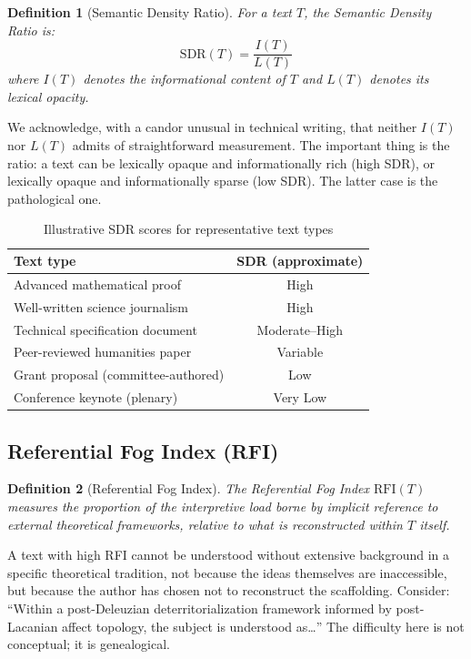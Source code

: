 \documentclass[12pt, a4paper]{article}
\newtheorem{definition}{Definition}
\begin{document}
\begin{definition}[Semantic Density Ratio]
For a text $T$, the Semantic Density Ratio is:
\[
\mathrm{SDR}(T) = \frac{I(T)}{L(T)}
\]
where $I(T)$ denotes the informational content of $T$ and $L(T)$ denotes its lexical opacity.
\end{definition}

We acknowledge, with a candor unusual in technical writing, that neither $I(T)$ nor $L(T)$ admits of straightforward measurement. The important thing is the ratio: a text can be lexically opaque and informationally rich (high SDR), or lexically opaque and informationally sparse (low SDR). The latter case is the pathological one.

\begin{table}[H]
\centering
\caption{Illustrative SDR scores for representative text types}
\begin{tabular}{lc}
\toprule
\textbf{Text type} & \textbf{SDR (approximate)} \\
\midrule
Advanced mathematical proof & High \\
Well-written science journalism & High \\
Technical specification document & Moderate--High \\
Peer-reviewed humanities paper & Variable \\
Grant proposal (committee-authored) & Low \\
Conference keynote (plenary) & Very Low \\
\bottomrule
\end{tabular}
\end{table}

\subsection{Referential Fog Index (RFI)}

\begin{definition}[Referential Fog Index]
The Referential Fog Index $\mathrm{RFI}(T)$ measures the proportion of the interpretive load borne by implicit reference to external theoretical frameworks, relative to what is reconstructed within $T$ itself.
\end{definition}

A text with high RFI cannot be understood without extensive background in a specific theoretical tradition, not because the ideas themselves are inaccessible, but because the author has chosen not to reconstruct the scaffolding. Consider: ``Within a post-Deleuzian deterritorialization framework informed by post-Lacanian affect topology, the subject is understood as\ldots'' The difficulty here is not conceptual; it is genealogical.
\end{document}
